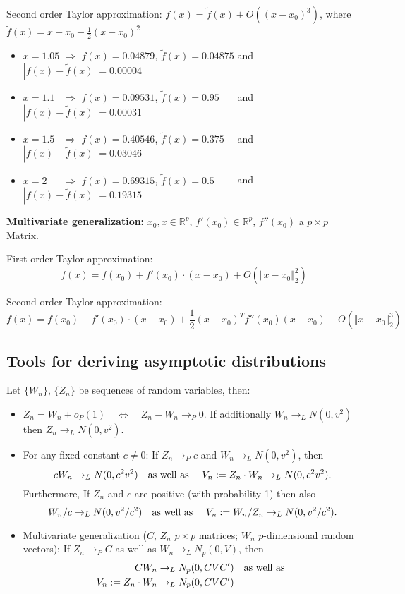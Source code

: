 \documentclass[
]{book}
\providecommand{\tightlist}{%
  \setlength{\itemsep}{0pt}\setlength{\parskip}{0pt}}
\begin{document}
\hfill\break

Second order Taylor approximation: \(f(x)=\tilde f(x)+O((x-x_0)^{3})\), where \(\tilde f(x)=x-x_0-\frac{1}{2} (x-x_0)^2\)

\begin{itemize}
\tightlist
\item
  \(x=1.05\) \(\Rightarrow\) \(f(x)=0.04879\), \(\tilde f(x)=0.04875\) and \(|f(x)-\tilde f(x)|=0.00004\)
\item
  \(x=1.1\phantom{0}\) \(\Rightarrow\) \(f(x)=0.09531\), \(\tilde f(x)=0.95\phantom{000}\) and \(|f(x)-\tilde f(x)|=0.00031\)
\item
  \(x=1.5\phantom{0}\) \(\Rightarrow\) \(f(x)=0.40546\), \(\tilde f(x)=0.375\phantom{00}\) and \(|f(x)-\tilde f(x)|=0.03046\)
\item
  \(x=2\phantom{.00}\) \(\Rightarrow\) \(f(x)=0.69315\), \(\tilde f(x)=0.5\phantom{0000}\) and \(|f(x)-\tilde f(x)|=0.19315\)
\end{itemize}

\hfill\break

\textbf{Multivariate generalization:} \(x_0,x\in\mathbb{R}^p\), \(f'(x_0)\in\mathbb{R}^p\), \(f''(x_0)\) a \(p\times p\) Matrix.

First order Taylor approximation:
\[f(x)=f(x_0)+f'(x_0)\cdot(x-x_0)+O(\Vert x-x_0\Vert_2^2)\]

Second order Taylor approximation:
\[f(x)=f(x_0)+f'(x_0)\cdot(x-x_0)+\frac{1}{2} (x-x_0)^T f''(x_0)(x-x_0)+O(\Vert x-x_0\Vert_2^3)\]

\hypertarget{tools-for-deriving-asymptotic-distributions}{%
\subsection{Tools for deriving asymptotic distributions}\label{tools-for-deriving-asymptotic-distributions}}

Let \(\{W_n\}\), \(\{Z_n\}\) be sequences of random variables, then:

\begin{itemize}
\tightlist
\item
  \(Z_n=W_n+o_P(1)\quad \Leftrightarrow \quad Z_n-W_n\to_P 0\). If additionally \(W_n\to_L N(0,v^2)\) then \(Z_n\to_L N(0,v^2)\).
\item
  For any fixed constant \(c\neq 0\): If \(Z_n\to_P c\) and \(W_n\to_L N(0,v^2)\), then
  \[cW_n\to_L N(0,c^2v^2)\quad\hbox{as well as }\quad  V_n:=Z_n\cdot W_n\to_L N(0,c^2v^2).\]
  Furthermore, If \(Z_n\) and \(c\) are positive (with probability 1) then also
  \[W_n/c\to_L N(0,v^2/c^2)\quad\hbox{as well as }\quad  V_n:= W_n/Z_n\to_L N(0,v^2/c^2).\]
\item
  Multivariate generalization (\(C\), \(Z_n\) \(p\times p\) matrices; \(W_n\) \(p\)-dimensional random vectors):
  If \(Z_n\to_P C\) as well as \(W_n\to_L N_p(0,V)\), then
  \begin{align*}
  CW_n&\to_L N_p(0,CVC')\quad\hbox{as well as }\\
  V_n:=Z_n\cdot W_n&\to_L N_p(0,CVC')
  \end{align*}
\end{itemize}
\end{document}

